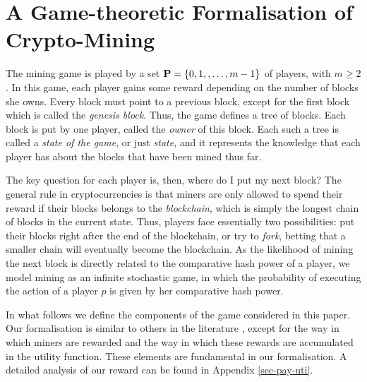 
\section{A Game-theoretic Formalisation of Crypto-Mining}
\label{sec-formalization}

The mining game is played by a set $\mathbf{P} = \{0, 1, , \ldots, m-1\}$ of players, with $m \geq 2$.
In this game, each player gains some reward depending on the number of blocks she owns. Every block must point to a previous block, except for the first block which is called the {\em genesis block}. Thus, the game defines a tree of blocks. Each block is put by one player, called the {\em owner} of this block. Each such a tree is called a {\em state of the game}, or just {\em state}, and it represents the knowledge that each player has about the blocks that have been mined thus far.

The key question for each player is, then, where do I put my next block? The general rule in cryptocurrencies is that miners are only allowed to spend their reward if their blocks belongs to the \emph{blockchain}, which is simply the longest chain of blocks in the current state. Thus, players face essentially two possibilities: put their blocks right after the end of the blockchain, or try to \emph{fork}, betting that a smaller chain will eventually become the blockchain. As the likelihood of mining the next block is directly related to the comparative hash power of a player, we model mining as an infinite stochastic game, in which the probability of executing the action of a player $p$ is given by her comparative hash power.

In what follows we define the components of the game considered in this paper. Our formalisation is similar to others in the literature \cite{mininggames:2016,koutsoupias2018blockchain}, except for the way in which miners are rewarded and the way in which these rewards are accumulated in the utility function. These elements are fundamental in our formalisation. A detailed analysis of our reward can be found in Appendix \ref{sec-pay-uti}.

